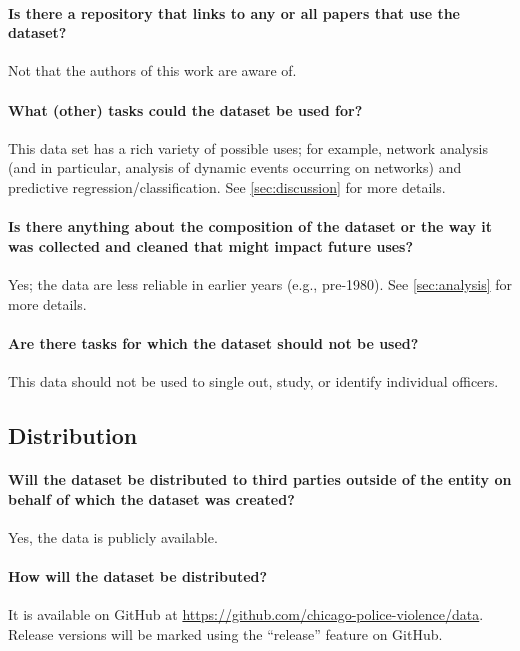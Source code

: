 \paragraph{Is there a repository that links to any or all papers that use the dataset?}
Not that the authors of this work are aware of.

\paragraph{What (other) tasks could the dataset be used for?}
This data set has a rich variety of possible uses; for example,
network analysis (and in particular, analysis of dynamic events occurring on networks)
and predictive regression/classification. See \cref{sec:discussion} for more details.

\paragraph{Is there anything about the composition of the dataset or the way it was collected and cleaned that might impact future uses?}
Yes; the data are less reliable in earlier years (e.g., pre-1980). See \cref{sec:analysis} for more details.

\paragraph{Are there tasks for which the dataset should not be used?}
This data should not be used to single out, study, or identify individual officers.

\subsection{Distribution}

\paragraph{Will the dataset be distributed to third parties outside of the entity on behalf of which the dataset was created?}
Yes, the data is publicly available.

\paragraph{How will the dataset be distributed?}
It is available on GitHub at \url{https://github.com/chicago-police-violence/data}.
Release versions will be marked using the ``release'' feature on GitHub.

